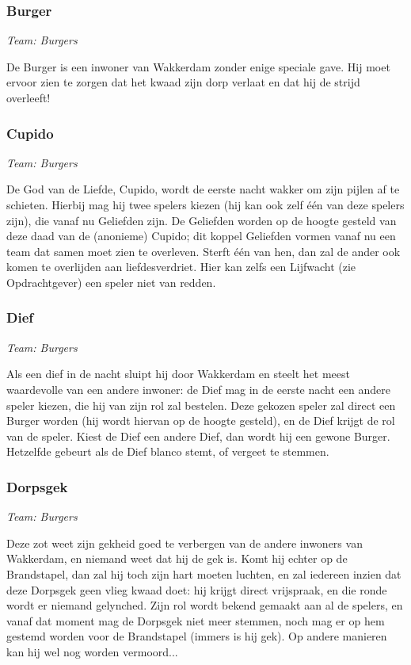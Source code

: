 \documentclass[12pt]{article}
\begin{document}
    \subsubsection{Burger}
      \emph{\scriptsize Team: Burgers}
    
      De Burger is een inwoner van Wakkerdam zonder enige speciale gave. Hij moet ervoor zien te zorgen dat het kwaad zijn dorp verlaat en dat hij de strijd overleeft!

    \subsubsection{Cupido}
      \emph{\scriptsize Team: Burgers}
    
      De God van de Liefde, Cupido, wordt de eerste nacht wakker om zijn pijlen af te schieten. Hierbij mag hij twee spelers kiezen (hij kan ook zelf \'e\'en van deze spelers zijn), die vanaf nu Geliefden zijn. De Geliefden worden op de hoogte gesteld van deze daad van de (anonieme) Cupido; dit koppel Geliefden vormen vanaf nu een team dat samen moet zien te overleven. Sterft \'e\'en van hen, dan zal de ander ook komen te overlijden aan liefdesverdriet. Hier kan zelfs een Lijfwacht (zie Opdrachtgever) een speler niet van redden.

    \subsubsection{Dief}
      \emph{\scriptsize Team: Burgers}
    
      Als een dief in de nacht sluipt hij door Wakkerdam en steelt het meest waardevolle van een andere inwoner: de Dief mag in de eerste nacht een andere speler kiezen, die hij van zijn rol zal bestelen. Deze gekozen speler zal direct een Burger worden (hij wordt hiervan op de hoogte gesteld), en de Dief krijgt de rol van de speler. Kiest de Dief een andere Dief, dan wordt hij een gewone Burger. Hetzelfde gebeurt als de Dief blanco stemt, of vergeet te stemmen.

    \subsubsection{Dorpsgek}
      \emph{\scriptsize Team: Burgers}
    
      Deze zot weet zijn gekheid goed te verbergen van de andere inwoners van Wakkerdam, en niemand weet dat hij de gek is. Komt hij echter op de Brandstapel, dan zal hij toch zijn hart moeten luchten, en zal iedereen inzien dat deze Dorpsgek geen vlieg kwaad doet: hij krijgt direct vrijspraak, en die ronde wordt er niemand gelynched. Zijn rol wordt bekend gemaakt aan al de spelers, en vanaf dat moment mag de Dorpsgek niet meer stemmen, noch mag er op hem gestemd worden voor de Brandstapel (immers is hij gek). Op andere manieren kan hij wel nog worden vermoord...
\end{document}
